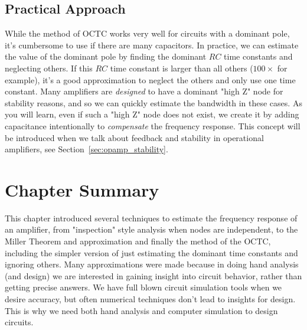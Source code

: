 \subsection{Practical Approach}
While the method of OCTC works very well for circuits with a dominant pole, it's cumbersome to use if there are many capacitors.  In practice, we can estimate the value of the dominant pole by finding the dominant $RC$ time constants and neglecting others.  If this $RC$ time constant is larger than all others ($100\times$ for example), it's a good approximation to neglect the others and only use one time constant. Many amplifiers are \textit{designed} to have a dominant "high Z" node for stability reasons, and so we can quickly estimate the bandwidth in these cases.  As you will learn, even if such a "high Z" node does not exist, we create it by adding capacitance intentionally to \textit{compensate} the frequency response.  This concept will be introduced when we talk about feedback and stability in operational amplifiers, see Section~\ref{sec:opamp_stability}.
\newpage
\section{Chapter Summary}
This chapter introduced several techniques to estimate the frequency response of an amplifier, from "inspection" style analysis when nodes are independent, to the Miller Theorem and approximation and finally the method of the OCTC, including the simpler version of just estimating the dominant time constants and ignoring others.  Many approximations were made because in doing hand analysis (and design) we are interested in gaining insight into circuit behavior, rather than getting precise answers.  We have full blown circuit simulation tools when we desire accuracy, but often numerical techniques don't lead to insights for design.  This is why we need both hand analysis and computer simulation to design circuits.
